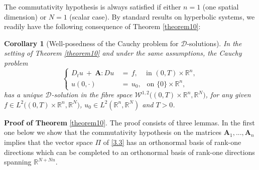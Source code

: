 \documentclass{amsart}
\newtheorem{corollary}[theorem]{Corollary}
\theoremstyle{definition}
\numberwithin{equation}{section}
\begin{document}
The commutativity hypothesis is always satisfied if either $n=1$ (one spatial dimension) or $N=1$ (scalar case). By standard results on hyperbolic systems, we readily have the following consequence of Theorem \ref{theorem10}:

\begin{corollary}[Well-posedness of the Cauchy problem for ${\mathcal{D}}$-solutions] \label{corollary11} In the setting of Theorem \ref{theorem10} and under the same assumptions, the Cauchy problem
\[
\left\{
\begin{split}
D_tu\ +\ {\textbf{A}} {\!:\!} Du\, &=\, f, \, \ \ \ \text{ in }(0,T){\times} {\mathbb{R}}^n,\\
u(0,\cdot)\, &=\, u_0, \  \ \text{ on }\{0\}{\times} {\mathbb{R}}^n,
\end{split}
\right.
\]
has a unique ${\mathcal{D}}$-solution in the fibre space $\mathscr{W}^{1,2}\big((0,T)\! {\times} \! {\mathbb{R}}^n,{\mathbb{R}}^N\big)$, for any given $f\in L^2\big(  (0,T)\! {\times} \!{\mathbb{R}}^n,{\mathbb{R}}^N\big)$, $u_0\in L^2 ({\mathbb{R}}^n,{\mathbb{R}}^N )$ and $T>0$. 
\end{corollary}

{\medskip \noindent \textbf{Proof of Theorem} } \ref{theorem10}. The proof consists of three lemmas. In the first one below we show that the commutativity hypothesis on the matrices ${\textbf{A}}_1,...,{\textbf{A}}_n$ implies that the vector space $\Pi$ of \eqref{3.3} has an orthonormal basis of rank-one directions which can be completed to an orthonormal basis of rank-one directions spanning ${\mathbb{R}}^{N+Nn}$.
\end{document}

